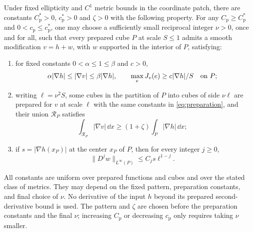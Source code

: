 \begin{lemma}\label{lem:corrugation}
Under fixed ellipticity and $C^1$ metric bounds in the coordinate
patch, there are constants $C_{\mathrm p}^*>0$,
$c_{\mathrm p}^*>0$ and $\zeta>0$ with the following property.
For any $C_{\mathrm p}\ge C_{\mathrm p}^*$ and
$0<c_{\mathrm p}\le c_{\mathrm p}^*$, one may choose a sufficiently
small reciprocal integer $\nu>0$, once and for all, such that every
prepared cube $P$ at scale $S\le1$ admits a smooth modification
$v=h+w$, with $w$ supported in the interior of $P$, satisfying:
\begin{enumerate}[label=\textup{(\roman*)}]
 \item for fixed constants $0<\alpha\le1\le\beta$ and $c>0$,
 \[
  \alpha|\nabla h|\le|\nabla v|\le\beta|\nabla h|,
  \qquad
  \max_eJ_v(e)\ge c|\nabla h|/S
  \quad\hbox{on }P;
 \]
 \item writing $\ell=\nu^2S$, some cubes in the partition of $P$
 into cubes of side $\nu\ell$ are prepared for $v$ at scale $\ell$
 with the same constants in \eqref{eq:preparation}, and their union
 $\mathcal R_P$ satisfies
 \begin{equation}\label{eq:local-mass-gain}
  \int_{\mathcal R_P}|\nabla v|\,\dd x
  \ge(1+\zeta)\int_P|\nabla h|\,\dd x;
 \end{equation}
 \item if $s=|\nabla h(x_P)|$ at the center $x_P$ of $P$, then for
 every integer $j\ge0$,
 \begin{equation}\label{eq:corrugation-derivatives}
  \|D^jw\|_{L^\infty(P)}\le C_j s\ell^{1-j}.
 \end{equation}
\end{enumerate}
All constants are uniform over prepared functions and cubes and over
the stated class of metrics.  They may depend on the fixed pattern,
preparation constants, and final choice of $\nu$.  No derivative of
the input $h$ beyond its prepared second-derivative bound is used.
The pattern and $\zeta$ are chosen before the preparation constants
and the final $\nu$; increasing $C_{\mathrm p}$ or decreasing
$c_{\mathrm p}$ only requires taking $\nu$ smaller.
\end{lemma}

